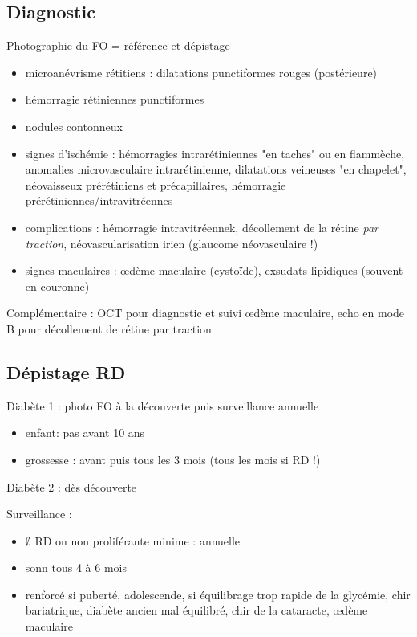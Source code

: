 \documentclass[11pt]{article}
\begin{document}
\subsection{Diagnostic}
\label{sec:org27a4e0a}
Photographie du FO = référence et dépistage
\begin{itemize}
\item microanévrisme rétitiens : dilatations punctiformes rouges (postérieure)
\item hémorragie rétiniennes punctiformes
\item nodules contonneux
\item signes d'ischémie : hémorragies intrarétiniennes "en taches" ou en flammèche, anomalies
microvasculaire intrarétinienne, dilatations veineuses "en chapelet",
néovaisseux prérétiniens et précapillaires, hémorragie prérétiniennes/intravitréennes
\item complications : hémorragie intravitréennek, décollement de la rétine \emph{par
traction}, néovascularisation irien (\thus glaucome néovasculaire !)
\item signes maculaires : \oe{}dème maculaire (cystoïde), exsudats lipidiques
(souvent en couronne)
\end{itemize}

Complémentaire : OCT pour diagnostic et suivi \oe{}dème maculaire, echo en mode B
pour décollement de rétine par traction

\subsection{Dépistage RD}
\label{sec:org66eb85a}
Diabète 1 : photo FO à la découverte puis surveillance annuelle
\begin{itemize}
\item enfant: pas avant 10 ans
\item grossesse : avant puis tous les 3 mois (tous les mois si RD !)
\end{itemize}
Diabète 2 : dès découverte

Surveillance :
\begin{itemize}
\item \(\emptyset\) RD on non proliférante minime : annuelle
\item sonn tous 4 à 6 mois
\item renforcé si puberté, adolescende, si équilibrage trop rapide de la glycémie,
chir bariatrique, diabète ancien mal équilibré, chir de la cataracte,
\oe{}dème maculaire
\end{itemize}
\end{document}
